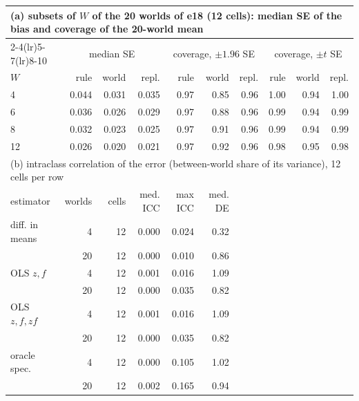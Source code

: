 \begin{tabular}{lrrrrrrrrr}
\toprule
\multicolumn{10}{l}{(a) subsets of $W$ of the 20 worlds of e18 (12 cells): median SE of the bias and coverage of the 20-world mean} \\
\cmidrule(lr){2-4}\cmidrule(lr){5-7}\cmidrule(lr){8-10}
 & \multicolumn{3}{c}{median SE} & \multicolumn{3}{c}{coverage, $\pm1.96$ SE} & \multicolumn{3}{c}{coverage, $\pm t$ SE} \\
$W$ & rule & world & repl. & rule & world & repl. & rule & world & repl. \\
\midrule
4 & 0.044 & 0.031 & 0.035 & 0.97 & 0.85 & 0.96 & 1.00 & 0.94 & 1.00 \\
6 & 0.036 & 0.026 & 0.029 & 0.97 & 0.88 & 0.96 & 0.99 & 0.94 & 0.99 \\
8 & 0.032 & 0.023 & 0.025 & 0.97 & 0.91 & 0.96 & 0.99 & 0.94 & 0.99 \\
12 & 0.026 & 0.020 & 0.021 & 0.97 & 0.92 & 0.96 & 0.98 & 0.95 & 0.98 \\
\midrule
\multicolumn{10}{l}{(b) intraclass correlation of the error (between-world share of its variance), 12 cells per row} \\
estimator & worlds & cells & med. ICC & max ICC & med. DE & & & & \\
diff. in means & 4 & 12 & 0.000 & 0.024 & 0.32 &  &  &  &  \\
 & 20 & 12 & 0.000 & 0.010 & 0.86 &  &  &  &  \\
OLS $z,f$ & 4 & 12 & 0.001 & 0.016 & 1.09 &  &  &  &  \\
 & 20 & 12 & 0.000 & 0.035 & 0.82 &  &  &  &  \\
OLS $z,f,zf$ & 4 & 12 & 0.001 & 0.016 & 1.09 &  &  &  &  \\
 & 20 & 12 & 0.000 & 0.035 & 0.82 &  &  &  &  \\
oracle spec. & 4 & 12 & 0.000 & 0.105 & 1.02 &  &  &  &  \\
 & 20 & 12 & 0.002 & 0.165 & 0.94 &  &  &  &  \\
\bottomrule
\end{tabular}
